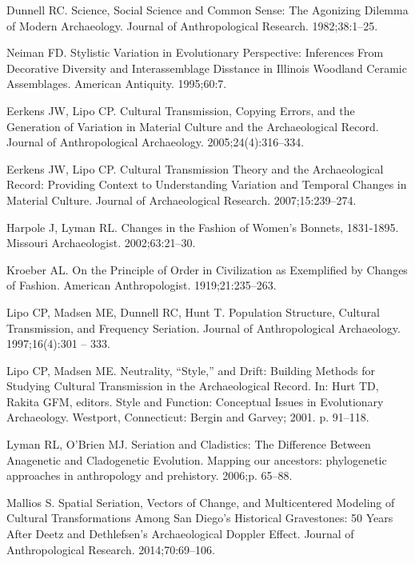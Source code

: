 \documentclass[10pt,letterpaper]{article}
\begin{document}
\begin{thebibliography}{10}
Dunnell RC.
\newblock Science, Social Science and Common Sense: The Agonizing Dilemma of
  Modern Archaeology.
\newblock Journal of Anthropological Research. 1982;38:1--25.

Neiman FD.
\newblock Stylistic Variation in Evolutionary Perspective: Inferences From
  Decorative Diversity and Interassemblage Disstance in Illinois Woodland
  Ceramic Assemblages.
\newblock American Antiquity. 1995;60:7.

Eerkens JW, Lipo CP.
\newblock Cultural Transmission, Copying Errors, and the Generation of
  Variation in Material Culture and the Archaeological Record.
\newblock Journal of Anthropological Archaeology. 2005;24(4):316--334.

Eerkens JW, Lipo CP.
\newblock Cultural Transmission Theory and the Archaeological Record: Providing
  Context to Understanding Variation and Temporal Changes in Material Culture.
\newblock Journal of Archaeological Research. 2007;15:239--274.

Harpole J, Lyman RL.
\newblock Changes in the Fashion of Women's Bonnets, 1831-1895.
\newblock Missouri Archaeologist. 2002;63:21--30.

Kroeber AL.
\newblock On the Principle of Order in Civilization as Exemplified by Changes
  of Fashion.
\newblock American Anthropologist. 1919;21:235--263.

Lipo CP, Madsen ME, Dunnell RC, Hunt T.
\newblock Population Structure, Cultural Transmission, and Frequency Seriation.
\newblock Journal of Anthropological Archaeology. 1997;16(4):301 -- 333.

Lipo CP, Madsen ME.
\newblock Neutrality, ``Style,'' and Drift: Building Methods for Studying
  Cultural Transmission in the Archaeological Record.
\newblock In: Hurt TD, Rakita GFM, editors. Style and Function: Conceptual
  Issues in Evolutionary Archaeology. Westport, Connecticut: Bergin and Garvey;
  2001. p. 91--118.

Lyman RL, O'Brien MJ.
\newblock Seriation and Cladistics: The Difference Between Anagenetic and
  Cladogenetic Evolution.
\newblock Mapping our ancestors: phylogenetic approaches in anthropology and
  prehistory. 2006;p. 65--88.

Mallios S.
\newblock Spatial Seriation, Vectors of Change, and Multicentered Modeling of
  Cultural Transformations Among San Diego's Historical Gravestones: 50 Years
  After Deetz and Dethlefsen's Archaeological Doppler Effect.
\newblock Journal of Anthropological Research. 2014;70:69--106.


\end{thebibliography}
\end{document}
